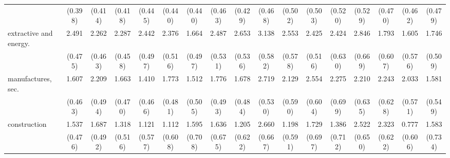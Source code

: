 {\begin{tabular}{l*{16}{c}}
                    &     (0.398)         &     (0.414)         &     (0.418)         &     (0.445)         &     (0.440)         &     (0.440)         &     (0.463)         &     (0.429)         &     (0.468)         &     (0.502)         &     (0.503)         &     (0.520)         &     (0.529)         &     (0.470)         &     (0.462)         &     (0.479)         \\
[1em]
extractive and energy.&       2.491\sym{***}&       2.262\sym{***}&       2.287\sym{***}&       2.442\sym{***}&       2.376\sym{***}&       1.664\sym{***}&       2.487\sym{***}&       2.653\sym{***}&       3.138\sym{***}&       2.553\sym{***}&       2.425\sym{***}&       2.424\sym{***}&       2.846\sym{***}&       1.793\sym{**} &       1.605\sym{**} &       1.746\sym{***}\\
                    &     (0.475)         &     (0.463)         &     (0.458)         &     (0.497)         &     (0.516)         &     (0.497)         &     (0.531)         &     (0.536)         &     (0.582)         &     (0.578)         &     (0.516)         &     (0.630)         &     (0.669)         &     (0.607)         &     (0.576)         &     (0.509)         \\
[1em]
manufactures, sec.  &       1.607\sym{***}&       2.209\sym{***}&       1.663\sym{***}&       1.410\sym{**} &       1.773\sym{***}&       1.512\sym{**} &       1.776\sym{***}&       1.678\sym{***}&       2.719\sym{***}&       2.129\sym{***}&       2.554\sym{***}&       2.275\sym{**} &       2.210\sym{***}&       2.243\sym{***}&       2.033\sym{***}&       1.581\sym{**} \\
                    &     (0.463)         &     (0.494)         &     (0.470)         &     (0.466)         &     (0.481)         &     (0.505)         &     (0.493)         &     (0.484)         &     (0.530)         &     (0.590)         &     (0.604)         &     (0.699)         &     (0.635)         &     (0.628)         &     (0.571)         &     (0.549)         \\
[1em]
construction        &       1.537\sym{**} &       1.687\sym{***}&       1.318\sym{*}  &       1.121         &       1.112         &       1.595\sym{*}  &       1.636\sym{*}  &       1.205         &       2.660\sym{***}&       1.198\sym{*}  &       1.729\sym{*}  &       1.386         &       2.522\sym{***}&       2.323\sym{***}&       0.777         &       1.583\sym{*}  \\
                    &     (0.476)         &     (0.492)         &     (0.516)         &     (0.577)         &     (0.608)         &     (0.708)         &     (0.675)         &     (0.622)         &     (0.667)         &     (0.591)         &     (0.697)         &     (0.712)         &     (0.650)         &     (0.622)         &     (0.606)         &     (0.734)         \\

\end{tabular}}
